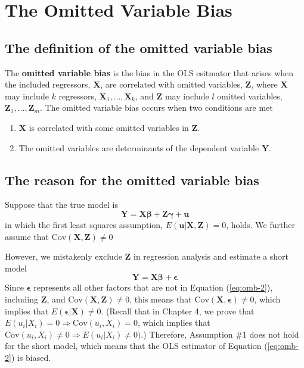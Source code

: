 \documentclass[a4paper,11pt]{article}
\newcommand{\cov}{\mathrm{Cov}}
\begin{document}
\section{The Omitted Variable Bias}
\label{sec:org4f48cb0}
\subsection{The definition of the omitted variable bias}
\label{sec:org007968b}
The \textbf{omitted variable bias} is the bias in the OLS esitmator that arises
when the included regressors, \(\mathbf{X}\), are correlated with
omitted variables, \(\mathbf{Z}\), where \(\mathbf{X}\) may include \(k\)
regressors, \(\mathbf{X}_1, \ldots, \mathbf{X}_k\), and \(\mathbf{Z}\)
may include \(l\) omitted variables, \(\mathbf{Z}_1, \ldots,
 \mathbf{Z}_m\). The omitted variable bias occurs
when two conditions are met
\begin{enumerate}
\item \(\mathbf{X}\) is correlated with some omitted variables in \(\mathbf{Z}\).
\item The omitted variables are determinants of the dependent variable
\(\mathbf{Y}\).
\end{enumerate}

\subsection{The reason for the omitted variable bias}
\label{sec:org4b07284}
Suppose that the true model is
\begin{equation}
\label{eq:omb-1}
\mathbf{Y} = \mathbf{X}\boldsymbol{\beta} + \mathbf{Z}\boldsymbol{\gamma} + \mathbf{u}
\end{equation}
in which the first least squares assumption, \(E(\mathbf{u} |
\mathbf{X}, \mathbf{Z}) = 0\), holds. We further assume that \(\cov(\mathbf{X}, \mathbf{Z})
\neq 0\)

However, we mistakenly exclude \(\mathbf{Z}\) in regression analysis and
estimate a short model
\begin{equation}
\label{eq:omb-2}
\mathbf{Y} = \mathbf{X}\boldsymbol{\beta} + \boldsymbol{\epsilon}
\end{equation}
Since \(\boldsymbol{\epsilon}\) represents all other factors that are not
in Equation (\ref{eq:omb-2}), including \(\mathbf{Z}\), and
\(\cov(\mathbf{X}, \mathbf{Z}) \neq 0\), this means that
\(\cov(\mathbf{X}, \boldsymbol{\epsilon}) \neq 0\), which implies that
\(E(\boldsymbol{\epsilon} | \mathbf{X}) \neq 0\). (Recall that in
Chapter 4, we prove that \(E(u_i | X_i) = 0 \Rightarrow \cov(u_i, X_i)
= 0\), which implies that \(\cov(u_i, X_i) \neq 0 \Rightarrow E(u_i |
X_i) \neq 0)\).) Therefore, Assumption \#1 does not hold for the short
model, which means that the OLS estimator of Equation (\ref{eq:omb-2})
is biased.
\end{document}
